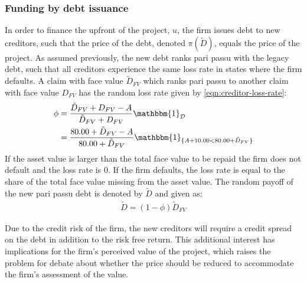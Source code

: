 \documentclass[main.tex]{subfiles}
\begin{document}
    \subsubsection{Funding by debt issuance}\label{sec:example-risk-free-project-debt-issuance}
        In order to finance the upfront of the project, $u$, the firm issues debt to new creditors, 
        such that the price of the debt, denoted $\pi(\tilde{D})$, equals the price of the project.
        As assumed previously, the new debt ranks pari passu with the legacy debt, 
        such that all creditors experience the same loss rate in states where the firm defaults.
        A claim with face value $\tilde{D}_{FV}$ which ranks pari passu to another claim 
        with face value $D_{FV}$ has the random loss rate given by \cref{eqn:creditor-loss-rate}:
            \begin{align}
                \phi
                &=
                    \frac{
                        \tilde{D}_{FV} + D_{FV} - A
                    }{
                        \tilde{D}_{FV} + D_{FV}
                    }
                    \mathbbm{1}_{\mathcal{D}}
                \nonumber \\
                &=
                    \frac{
                        80.00 + \tilde{D}_{FV} - A
                    }{
                        80.00 + \tilde{D}_{FV}
                    }
                    \mathbbm{1}_{\{A + 10.00 < 80.00 + \tilde{D}_{FV}\}} 
            \end{align}
        If the asset value is larger than the total face value to be repaid
        the firm does not default and the loss rate is $0$.
        If the firm defaults, the loss rate is equal to the share of the total face value missing from the asset value.
        The random payoff of the new pari passu debt is denoted by $\tilde{D}$ and given as:
            \begin{align}
                \tilde{D}
                    = (1 - \phi)\tilde{D}_{FV}
            \end{align}

        Due to the credit risk of the firm, the new creditors will require a credit spread on the debt 
        in addition to the risk free return.
        This additional interest has implications for the firm's perceived value of the project, 
        which raises the problem for debate about whether the price should be reduced 
        to accommodate the firm's assessment of the value.
\end{document}
